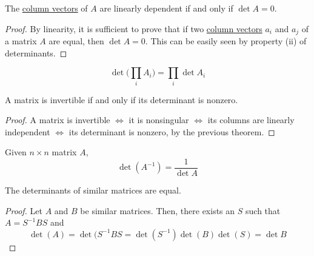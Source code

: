  \begin{theorem}
    \label{thm:vanishing-determinant-and-linear-dependence}
    The \hyperref[def:column-vector]{column vectors} of $A$ are linearly dependent if and only if $\det{A} = 0$. 
  \end{theorem}
  \begin{proof}
    By linearity, it is sufficient to prove that if two \hyperref[def:column-vector]{column vectors} $a_i$ and $a_j$ of a matrix $A$ are equal, then $\det{A} = 0$. This can be easily seen by property (ii) of determinants. 
  \end{proof}

  \begin{theorem}
    \label{thm:multiplicativity-of-the-determinant}
    \begin{equation}
      \det{\bigg(\prod_i A_i \bigg)} = \prod_i \det{A_i}
    \end{equation}
  \end{theorem}

  \begin{theorem}
    \label{thm:invertibility-via-the-determinant}
    A matrix is invertible if and only if its determinant is nonzero. 
  \end{theorem}
  \begin{proof}
    A matrix is invertible $\iff$ it is nonsingular $\iff$ its columns are linearly independent $\iff$ its determinant is nonzero, by the previous theorem. 
  \end{proof}

  \begin{corollary}
    \label{thm:determinant-of-an-inverse}
    Given $n \times n$ matrix $A$,
    \begin{equation}
      \det{(A^{-1})} = \frac{1}{\det{A}}
    \end{equation}
  \end{corollary}

  \begin{theorem}
    \label{thm:similar-matrices-have-equal-determinants}
    The determinants of similar matrices are equal. 
  \end{theorem}
  \begin{proof}
    Let $A$ and $B$ be similar matrices. Then, there exists an $S$ such that $A = S^{-1} B S$ and 
    \begin{equation}
      \det{(A)} = \det{(S^{-1} B S} = \det{(S^{-1})} \det{(B)} \det{(S)} = \det{B}
    \end{equation}
  \end{proof}

